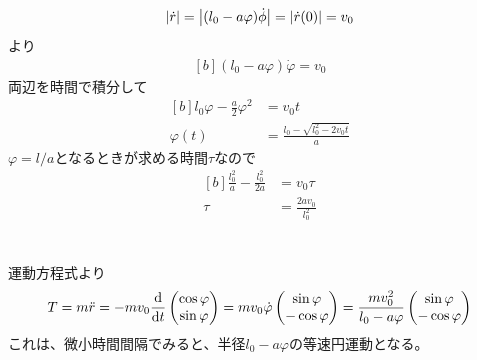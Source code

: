 \documentclass[../ap_2012.tex]{subfiles}
\begin{document}
\section{}
\begin{equation}\begin{aligned}[b]
    \abs{\dot{r}}=\abs{(l_0-a\varphi)\dot{\phi}} = \abs{\dot{r}(0)}=v_0
\end{aligned}\end{equation}
より
\begin{equation}\begin{aligned}[b]
    (l_0-a\varphi)\dot{\varphi} = v_0
\end{aligned}\end{equation}
両辺を時間で積分して
\begin{equation}\begin{aligned}[b]
    l_0\varphi-\frac{a}{2}\varphi^2 &= v_0t\\
    \varphi(t)&=\frac{l_0-\sqrt{l_0^2-2v_0t}}{a}
\end{aligned}\end{equation}
\(\varphi=l/a\)となるときが求める時間\(\tau\)なので
\begin{equation}\begin{aligned}[b]
    \frac{l_0^2}{a}-\frac{l_0^2}{2a}&=v_0\tau\\
    \tau &= \frac{2a v_0}{l_0^2}
\end{aligned}\end{equation}

\section{}
運動方程式より
\begin{equation}\begin{aligned}[b]
    T = m\ddot{r}=-mv_0\dv{t}\begin{pmatrix}
        \cos\varphi\\\sin\varphi
    \end{pmatrix}
    =mv_0\dot{\varphi}\begin{pmatrix}
        \sin\varphi\\ -\cos\varphi
    \end{pmatrix}
    = \frac{mv_0^2}{l_0-a\varphi}\begin{pmatrix}
        \sin\varphi\\ -\cos\varphi
    \end{pmatrix}
\end{aligned}\end{equation}
これは、微小時間間隔でみると、半径\(l_0-a\varphi\)の等速円運動となる。
\end{document}

